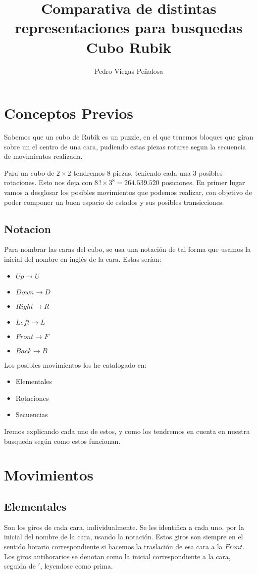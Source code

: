 \documentclass[11pt]{article}
\title{Comparativa de distintas representaciones para busquedas Cubo Rubik}
\author{Pedro Viegas Peñalosa}
\date{}
\begin{document}
\maketitle
\section{Conceptos Previos}
	Sabemos que un cubo de Rubik es un puzzle, en el que tenemos bloques que giran sobre un el centro de una cara, pudiendo estas piezas rotarse segun la secuencia de movimientos realizada.

	Para un cubo de $2\times 2$ tendremos 8 piezas, teniendo cada una 3 posibles rotaciones. Esto nos deja con $8\,! \times 3^{8} = 264.539.520$ posiciones.
	En primer lugar vamos a desglosar los posibles movimientos que podemos realizar, con objetivo de poder componer un buen espacio de estados y sus posibles transicciones.

\subsection{Notacion}
	Para nombrar las caras del cubo, se usa una notación de tal forma que usamos la inicial del nombre en inglés de la cara. Estas serían:
\begin{itemize}
	\item{$Up \rightarrow U$}
	\item{$Down \rightarrow D$}
	\item{$Right \rightarrow R$}
	\item{$Left \rightarrow L$}
	\item{$Front \rightarrow F$}
	\item{$Back \rightarrow B$}
\end{itemize}
	Los posibles movimientos los he catalogado en:

\begin{itemize}
	\item Elementales
	\item Rotaciones
	\item Secuencias
\end{itemize}

	Iremos explicando cada uno de estos, y como los tendremos en cuenta en nuestra busqueda según como estos funcionan.

\section{Movimientos}

\subsection{Elementales}
	Son los giros de cada cara, individualmente. Se les identifica a cada uno, por la inicial del nombre de la cara, usando la notación.
	Estos giros son siempre en el sentido horario correspondiente si hacemos la traslación de esa cara a la $Front$. Los giros antihorarios se denotan como la inicial correspondiente a la cara, seguida de $'$, leyendose como prima.
	
\end{document}
